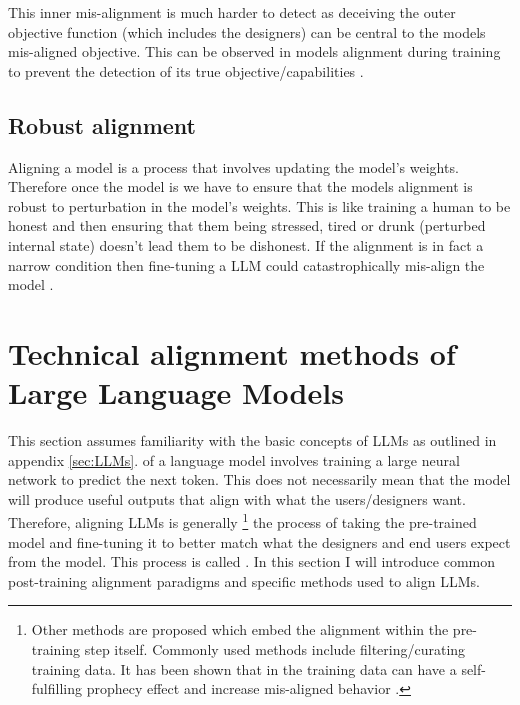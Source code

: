 This inner mis-alignment is much harder to detect as deceiving the outer objective function (which includes the designers) can be central to the models mis-aligned objective. This can be observed in models  alignment during training to prevent the detection of its true objective/capabilities \cite{greenblattAlignmentFakingLarge2024a,meinkeFrontierModelsAre2025c,vanderweijAISandbaggingLanguage2025}.


\subsection{Robust alignment}

Aligning a model is a process that involves updating the model's weights. Therefore once the model is  we have to ensure that the models alignment is robust to perturbation in the model's weights. This is like training a human to be honest and then ensuring that them being stressed, tired or drunk (perturbed internal state) doesn't lead them to be dishonest. If the alignment is in fact a narrow condition then fine-tuning a LLM could catastrophically mis-align the model \cite{betleyEmergentMisalignmentNarrow2026}.

\section{Technical alignment methods of Large Language Models}
\label{sec:technical_alignment}

This section assumes familiarity with the basic concepts of LLMs as outlined in appendix \ref{sec:LLMs}.  of a language model involves training a large neural network to predict the next token. This does not necessarily mean that the model will produce useful outputs that align with what the users/designers want. Therefore, aligning LLMs is generally \footnote{Other methods are proposed which embed the alignment within the pre-training step itself. Commonly used methods include filtering/curating training data. It has been shown that  in the training data can have a self-fulfilling prophecy effect and increase mis-aligned behavior \cite{ticeAlignmentPretrainingAI2026}.} the process of taking the pre-trained model and fine-tuning it to better match what the designers and end users expect from the model. This process is called . In this section I will introduce common post-training alignment paradigms and specific methods used to align LLMs.

